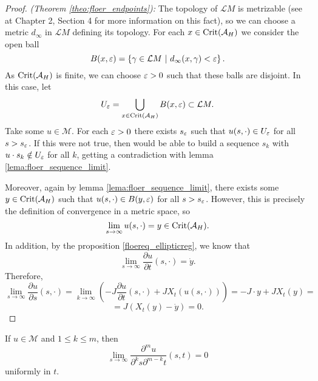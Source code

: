 \begin{proof} {\it (Theorem \ref{theo:floer_endpoints}):} The topology of $\mathcal{L}M$ is metrizable (see \cite{hirsch2012differential} at Chapter 2, Section 4 for more information on this fact), so we can choose a metric $d_{\infty}$ in $\mathcal{L}M$ defining its topology. For each $x \in \mathrm{Crit}(\mathcal{A}_H)$ we consider the open ball
\[B(x,\e) = \left\{ \gamma \in \mathcal{L}M \ | \ d_{\infty}(x,\gamma) < \e \right\} .\]
As  $\mathrm{Crit}(\mathcal{A}_H)$ is finite, we can choose $\varepsilon > 0$ such that these balls are disjoint. In this case, let
\[U_{\varepsilon} = \bigcup_{x \in \mathrm{Crit}(\mathcal{A}_H)} B(x,\varepsilon) \subset \mathcal{L}M .\]
Take some $u \in \mathcal{M}$. For each $\varepsilon > 0$ there exists $s_{\varepsilon}$ such that $u(s,\cdot) \in U_{\varepsilon}$ for all $s > s_{\varepsilon}$. If this were not true, then would be able to build a sequence $s_k$ with $u \cdot s_k \notin U_{\varepsilon}$ for all $k$, getting a contradiction with lemma \ref{lema:floer_sequence_limit}.

Moreover, again by lemma \ref{lema:floer_sequence_limit}, there exists some $y \in \mathrm{Crit}(\mathcal{A}_H)$ such that $u(s,\cdot) \in B(y,\varepsilon)$ for all $s > s_{\varepsilon}$. However, this is precisely the definition of convergence in a metric space, so
\[\lim_{s \rightarrow \infty} u(s,\cdot) = y \in \mathrm{Crit}(\mathcal{A}_H) .\]
In addition, by the proposition \ref{floereq_ellipticreg}, we know that
\[\lim_{s\rightarrow\infty} \frac{\partial u}{\partial t}(s,\cdot) = \dot{y} .\]
Therefore,
\[\lim_{s\rightarrow\infty} \frac{\partial u}{\partial s}(s,\cdot) = \lim_{k\rightarrow\infty} \left( - J \frac{\partial u}{\partial t}(s,\cdot) + JX_t(u(s,\cdot)) \right) = -J\cdot{y} + JX_t(y) =\]
\[= J(X_t(y) - \dot{y}) = 0 .\]
\end{proof}

\begin{coro} If $u \in \mathcal{M}$ and $1 \leq k \leq m$, then
\[\lim_{s\rightarrow\infty} \frac{\partial^m u}{\partial^k s \partial^{m-k} t}(s,t) = 0\]
uniformly in $t$.
\end{coro}
